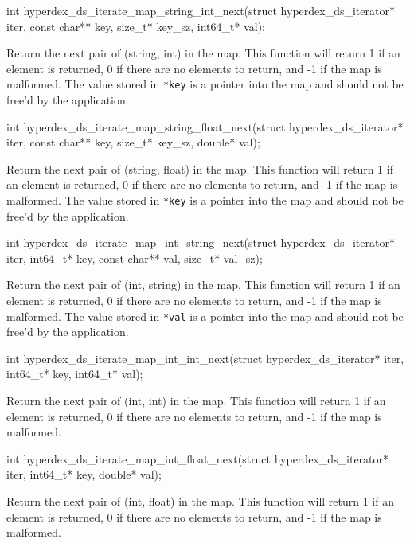 \funcsep
\begin{ccode}
int hyperdex_ds_iterate_map_string_int_next(struct hyperdex_ds_iterator* iter,
                                            const char** key, size_t* key_sz,
                                            int64_t* val);
\end{ccode}
\funcdesc Return the next pair of (string, int) in the map.  This function will
return 1 if an element is returned, 0 if there are no elements to return, and -1
if the map is malformed.  The value stored in \texttt{*key} is a pointer into
the map and should not be free'd by the application.

\funcsep
\begin{ccode}
int hyperdex_ds_iterate_map_string_float_next(struct hyperdex_ds_iterator* iter,
                                              const char** key, size_t* key_sz,
                                              double* val);
\end{ccode}
\funcdesc Return the next pair of (string, float) in the map.  This function
will return 1 if an element is returned, 0 if there are no elements to return,
and -1 if the map is malformed.  The value stored in \texttt{*key} is a pointer
into the map and should not be free'd by the application.

\funcsep
\begin{ccode}
int hyperdex_ds_iterate_map_int_string_next(struct hyperdex_ds_iterator* iter,
                                            int64_t* key,
                                            const char** val, size_t* val_sz);
\end{ccode}
\funcdesc Return the next pair of (int, string) in the map.  This function will
return 1 if an element is returned, 0 if there are no elements to return, and -1
if the map is malformed.  The value stored in \texttt{*val} is a pointer into
the map and should not be free'd by the application.

\funcsep
\begin{ccode}
int hyperdex_ds_iterate_map_int_int_next(struct hyperdex_ds_iterator* iter,
                                         int64_t* key, int64_t* val);
\end{ccode}
\funcdesc Return the next pair of (int, int) in the map.  This function will
return 1 if an element is returned, 0 if there are no elements to return, and -1
if the map is malformed.

\funcsep
\begin{ccode}
int hyperdex_ds_iterate_map_int_float_next(struct hyperdex_ds_iterator* iter,
                                           int64_t* key, double* val);
\end{ccode}
\funcdesc Return the next pair of (int, float) in the map.  This function will
return 1 if an element is returned, 0 if there are no elements to return, and -1
if the map is malformed.

